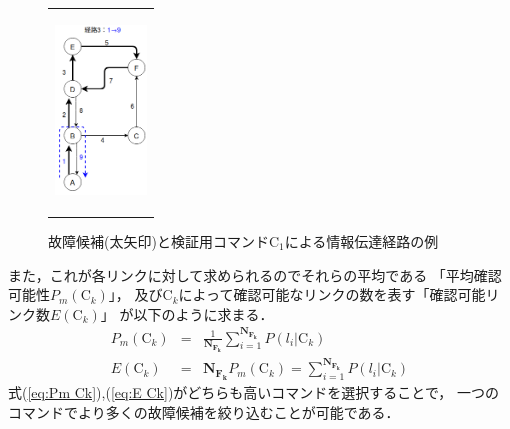 \documentclass[11pt]{jsarticle}%
\begin{document}
\begin{multicols}{2}
\begin{figure}[H]
\begin{tabular}{c}
\begin{minipage}{0.30\hsize}
           \label{fig:route2}
        \end{minipage}
        \begin{minipage}{0.30\hsize}
           \centering
           \includegraphics[height=4.5cm]{../figure/route3.png}
              \label{fig:route2}
           \end{minipage}
     \end{tabular} 
     \caption{故障候補(太矢印)と検証用コマンドC$_1$による情報伝達経路の例}%
     \label{fig:route}
\end{figure}
また，これが各リンクに対して求められるのでそれらの平均である
「平均確認可能性$P_m(\text{C}_k)$」，
及びC$_k$によって確認可能なリンクの数を表す「確認可能リンク数$E(\text{C}_k)$」
が以下のように求まる．
\begin{eqnarray}
  P_m(\text{C}_k) &=& \frac{1}{\mathbf{N_{F_k}}}\sum_{i=1}^{\mathbf{N_{F_k}}}
  P(l_i|\text{C}_k) \label{eq:Pm Ck} \\
  E(\text{C}_k) &=& \mathbf{N_{F_k}}P_m(\text{C}_k) =
   \sum_{i=1}^{\mathbf{N_{F_k}}}P(l_i|\text{C}_k) \label{eq:E Ck}
\end{eqnarray}
式(\ref{eq:Pm Ck}),(\ref{eq:E Ck})がどちらも高いコマンドを選択することで，
一つのコマンドでより多くの故障候補を絞り込むことが可能である．


\end{multicols}
\end{document}
